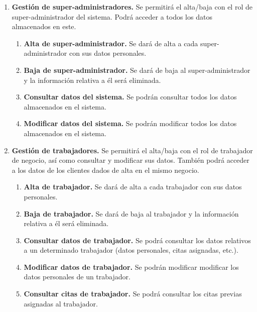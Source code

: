 \begin{enumerate}[leftmargin=1.75cm,start=1,label={\bfseries RF-\arabic*.}]
\setlength\itemsep{1em} %
    \item \textbf{Gestión de super-administradores.} Se permitirá el alta/baja con el rol de super-administrador del
    sistema. Podrá acceder a todos los datos almacenados en este.
    \begin{enumerate}[start=1,label={\bfseries RF-1.\arabic*.}]
        \item \textbf{Alta de super-administrador.} Se dará de alta a cada super-administrador con sus datos personales.
        \item \textbf{Baja de super-administrador.} Se dará de baja al super-administrador y la información relativa a
        él será eliminada.
        \item \textbf{Consultar datos del sistema.} Se podrán consultar todos los datos almacenados en el sistema.
        \item \textbf{Modificar datos del sistema.} Se podrán modificar todos los datos almacenados en el sistema.
    \end{enumerate}

    \item \textbf{Gestión de trabajadores.} Se permitirá el alta/baja con el rol de trabajador de negocio,
    así como consultar y modificar sus datos. También podrá acceder a los datos de los clientes dados de alta
    en el mismo negocio.
    \begin{enumerate}[start=1,label={\bfseries RF-2.\arabic*.}]
        \item \textbf{Alta de trabajador.} Se dará de alta a cada trabajador con sus datos personales.
        \item \textbf{Baja de trabajador.} Se dará de baja al trabajador y la información relativa a él será eliminada.
        \item \textbf{Consultar datos de trabajador.} Se podrá consultar los datos relativos a un determinado
        trabajador (datos personales, citas asignadas, etc.).
        \item \textbf{Modificar datos de trabajador.} Se podrán modificar modificar los datos personales de un
        trabajador.
        \item \textbf{Consultar citas de trabajador.} Se podrá consultar los citas previas asignadas al trabajador.
    \end{enumerate}


\end{enumerate}
